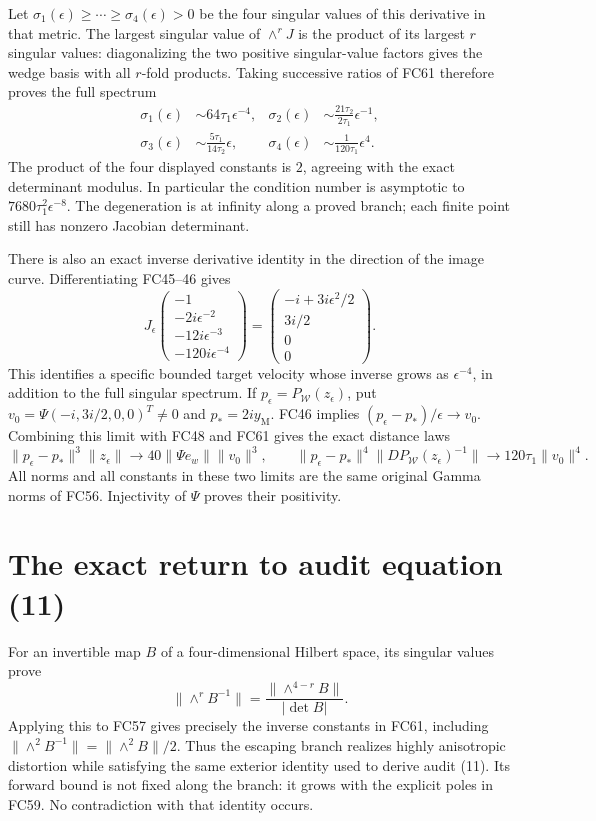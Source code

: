 Let $\sigma_1(\epsilon)\ge\cdots\ge\sigma_4(\epsilon)>0$
be the four singular values of this derivative in that metric. The
largest singular value of $\wedge^r J$ is the product of its largest
$r$ singular values: diagonalizing the two positive singular-value
factors gives the wedge basis with all $r$-fold products. Taking
successive ratios of FC61 therefore proves the full spectrum
\[
\begin{aligned}
 \sigma_1(\epsilon)&\sim64\tau_1\epsilon^{-4},&
 \sigma_2(\epsilon)&\sim\frac{21\tau_2}{2\tau_1}\epsilon^{-1},\\
 \sigma_3(\epsilon)&\sim\frac{5\tau_1}{14\tau_2}\epsilon,&
 \sigma_4(\epsilon)&\sim\frac{1}{120\tau_1}\epsilon^4.
\end{aligned}\tag{FC62}
\]
The product of the four displayed constants is $2$, agreeing with
the exact determinant modulus. In particular the condition number
is asymptotic to $7680\tau_1^2\epsilon^{-8}$. The degeneration is
at infinity along a proved branch; each finite point still has
nonzero Jacobian determinant.

There is also an exact inverse derivative identity in the direction
of the image curve. Differentiating FC45--46 gives
\[
 J_\epsilon
 \begin{pmatrix}-1\\-2i\epsilon^{-2}\\-12i\epsilon^{-3}\\-120i\epsilon^{-4}\end{pmatrix}
 =\begin{pmatrix}-i+3i\epsilon^2/2\\3i/2\\0\\0\end{pmatrix}.
 \tag{FC63}
\]
This identifies a specific bounded target velocity whose inverse
grows as $\epsilon^{-4}$, in addition to the full singular spectrum.
If $p_\epsilon=P_{\mathcal W}(z_\epsilon)$, put
$v_0=\Psi(-i,3i/2,0,0)^T\ne0$ and $p_*=2iy_{\mathrm M}$.
FC46 implies $(p_\epsilon-p_*)/\epsilon\to v_0$. Combining
this limit with FC48 and FC61 gives the exact distance laws
\[
 \|p_\epsilon-p_*\|^3\|z_\epsilon\|
       \longrightarrow40\|\Psi e_w\|\|v_0\|^3,
 \qquad
 \|p_\epsilon-p_*\|^4
 \|DP_{\mathcal W}(z_\epsilon)^{-1}\|
       \longrightarrow120\tau_1\|v_0\|^4.
 \tag{FC64}
\]
All norms and all constants in these two limits are the same original
Gamma norms of FC56. Injectivity of $\Psi$ proves their positivity.

\section{The exact return to audit equation (11)}
For an invertible map $B$ of a four-dimensional Hilbert space,
its singular values prove
\[
 \|\wedge^r B^{-1}\|=
       \frac{\|\wedge^{4-r}B\|}{|\det B|}.
 \tag{FC65}
\]
Applying this to FC57 gives precisely the inverse constants in FC61,
including $\|\wedge^2 B^{-1}\|=\|\wedge^2B\|/2$.
Thus the escaping branch realizes highly anisotropic distortion while
satisfying the same exterior identity used to derive audit (11).
Its forward bound is not fixed along the branch: it grows with the
explicit poles in FC59. No contradiction with that identity occurs.

